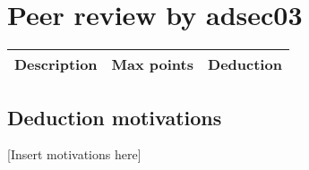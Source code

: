 \documentclass{article}
\begin{document}
	\section{Peer review by adsec03}
	 \begin{tabular}{| l | c | c |}
        \hline
        \textbf{Description} & \textbf{Max points} & \textbf{Deduction} \\
        \hline
        \hline
        
    \end{tabular}
    
    \subsection{Deduction motivations}
    		[Insert motivations here]
\end{document}
